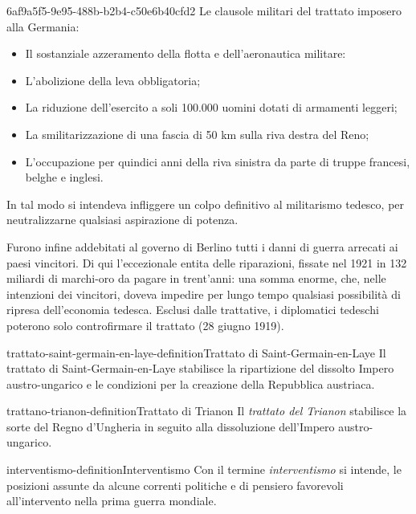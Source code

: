 \documentclass[preview]{standalone}
\begin{document}
\begin{snippet}{6af9a5f5-9e95-488b-b2b4-c50e6b40cfd2}
    Le clausole militari del trattato imposero alla Germania:
    \begin{itemize}
        \item Il sostanziale azzeramento della flotta e dell'aeronautica militare:
        \item L'abolizione della leva obbligatoria;
        \item La riduzione dell'esercito a soli 100.000 uomini dotati di armamenti leggeri;
        \item La smilitarizzazione di una fascia di 50 km sulla riva destra del Reno;
        \item L'occupazione per quindici anni della riva sinistra da parte di truppe francesi, belghe e inglesi.
    \end{itemize}
    
    In tal modo si intendeva infliggere un colpo definitivo al militarismo tedesco, per neutralizzarne
    qualsiasi aspirazione di potenza.
    
    Furono infine addebitati al governo di Berlino tutti i danni di guerra arrecati ai paesi vincitori.
    Di qui l'eccezionale entita delle riparazioni, fissate nel 1921 in 132 miliardi di marchi-oro da
    pagare in trent'anni: una somma enorme, che, nelle intenzioni dei vincitori, doveva impedire
    per lungo tempo qualsiasi possibilità di ripresa dell'economia tedesca. Esclusi dalle trattative, i
    diplomatici tedeschi poterono solo controfirmare il trattato (28 giugno 1919).
\end{snippet}

\begin{snippetdefinition}{trattato-saint-germain-en-laye-definition}{Trattato di Saint-Germain-en-Laye}
    Il trattato di Saint-Germain-en-Laye
    stabilisce la ripartizione del dissolto Impero austro-ungarico
    e le condizioni per la creazione della Repubblica austriaca. 
\end{snippetdefinition}

\begin{snippetdefinition}{trattano-trianon-definition}{Trattato di Trianon}
    Il \textit{trattato del Trianon} stabilisce la sorte
    del Regno d'Ungheria in seguito alla dissoluzione dell'Impero austro-ungarico. 
\end{snippetdefinition}


\begin{snippetdefinition}{interventismo-definition}{Interventismo}
    Con il termine \textit{interventismo} si intende,
    le posizioni assunte da alcune correnti politiche e di pensiero
    favorevoli all'intervento nella prima guerra mondiale.
\end{snippetdefinition}
\end{document}
